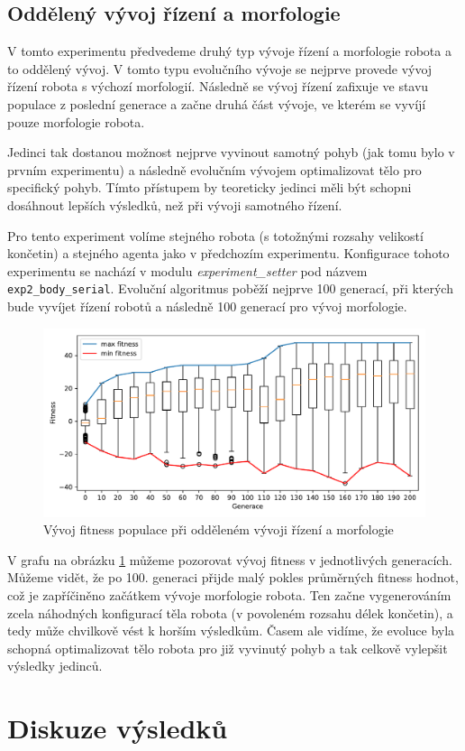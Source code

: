 
\subsection{Oddělený vývoj řízení a morfologie} \label{exp2:split_evo}

V tomto experimentu předvedeme druhý typ vývoje řízení a morfologie robota a to
oddělený vývoj. V tomto typu evolučního vývoje se nejprve provede vývoj řízení
robota s výchozí morfologií. Následně se vývoj řízení zafixuje ve stavu
populace z poslední generace a začne druhá část vývoje, ve kterém se vyvíjí
pouze morfologie robota.

Jedinci tak dostanou možnost nejprve vyvinout samotný pohyb (jak tomu bylo v
prvním experimentu) a následně evolučním vývojem optimalizovat tělo pro
specifický pohyb. Tímto přístupem by teoreticky jedinci měli být schopni
dosáhnout lepších výsledků, než při vývoji samotného řízení.

Pro tento experiment volíme stejného robota (s totožnými rozsahy velikostí
končetin) a stejného agenta jako v předchozím experimentu. Konfigurace tohoto
experimentu se nachází v modulu \emph{experiment\_setter} pod názvem
\texttt{exp2\_body\_serial}. Evoluční algoritmus poběží nejprve 100 generací,
při kterých bude vyvíjet řízení robotů a následně 100 generací pro vývoj
morfologie.

\begin{figure}[h!]
    \includegraphics[width=1\textwidth]{../img/experiment2_serial_10ticks.pdf}
    \caption{Vývoj fitness populace při odděleném vývoji řízení a morfologie}
    \label{exp:exp2_serial}
\end{figure}

V grafu na obrázku \ref{exp:exp2_serial} můžeme pozorovat vývoj fitness v
jednotlivých generacích. Můžeme vidět, že po 100. generaci přijde malý pokles
průměrných fitness hodnot, což je zapříčiněno začátkem vývoje morfologie
robota. Ten začne vygenerováním zcela náhodných konfigurací těla robota (v
povoleném rozsahu délek končetin), a tedy může chvilkově vést k horším
výsledkům. Časem ale vidíme, že evoluce byla schopná optimalizovat tělo robota
pro již vyvinutý pohyb a tak celkově vylepšit výsledky jedinců.

\section{Diskuze výsledků}
